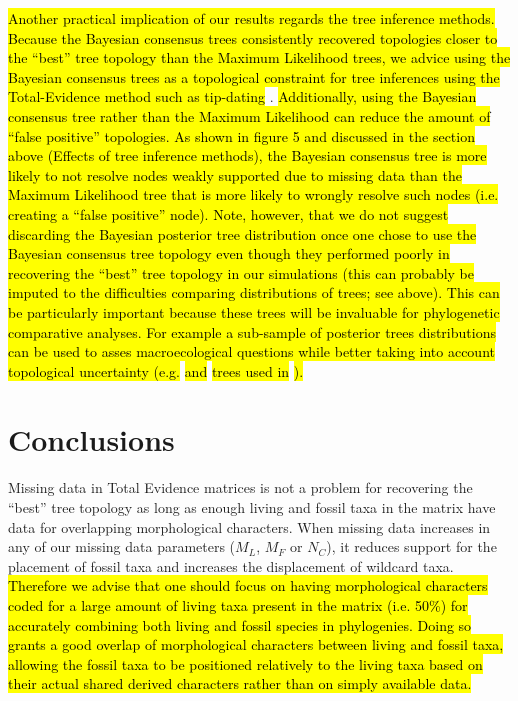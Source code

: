 \documentclass[12pt,letterpaper]{article}
\begin{document}
\hl{Another practical implication of our results regards the tree inference methods.
Because the Bayesian consensus trees consistently recovered topologies closer to the ``best'' tree topology than the Maximum Likelihood trees, we advice using the Bayesian consensus trees as a topological constraint for tree inferences using the Total-Evidence method such as tip-dating} \citep[\hl{e.g.}][\hl{; although it is possible that including dating information during tree inference could also improve the accuracy of the Bayesian posterior tree distribution}]{ronquista2012,Wood01032013,BEASTmaster}.
\hl{Additionally, using the Bayesian consensus tree rather than the Maximum Likelihood can reduce the amount of ``false positive'' topologies.
As shown in figure 5 and discussed in the section above (Effects of tree inference methods), the Bayesian consensus tree is more likely to not resolve nodes weakly supported due to missing data than the Maximum Likelihood tree that is more likely to wrongly resolve such nodes (i.e. creating a ``false positive'' node).
Note, however, that we do not suggest discarding the Bayesian posterior tree distribution once one chose to use the Bayesian consensus tree topology even though they performed poorly in recovering the ``best'' tree topology in our simulations (this can probably be imputed to the difficulties comparing distributions of trees; see above).
This can be particularly important because these trees will be invaluable for phylogenetic comparative analyses.
For example a sub-sample of posterior trees distributions can be used to asses macroecological questions while better taking into account topological uncertainty (e.g. }\citealt{FritzTree}\hl{ and }\citealt{jetzthe2012}\hl{ trees used in }\citealt{healy2014}\hl{).}

\section{Conclusions}
Missing data in Total Evidence matrices is not a problem for recovering the ``best'' tree topology as long as enough living and fossil taxa in the matrix have data for overlapping morphological characters.
When missing data increases in any of our missing data parameters ($M_{L}$, $M_{F}$ or $N_{C}$), it reduces support for the placement of fossil taxa and increases the displacement of wildcard taxa.
\hl{Therefore we advise that one should focus on having morphological characters coded for a large amount of living taxa present in the matrix (i.e. 50\%) for accurately combining both living and fossil species in phylogenies.
Doing so grants a good overlap of morphological characters between living and fossil taxa, allowing the fossil taxa to be positioned relatively to the living taxa based on their actual shared derived characters rather than on simply available data.}
\end{document}
